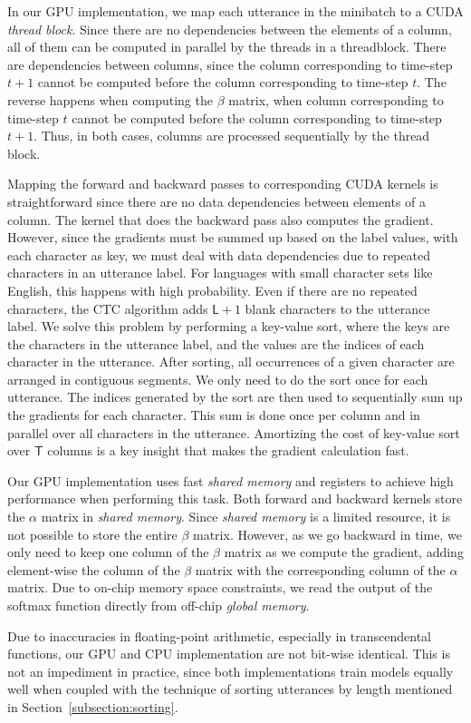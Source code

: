 \documentclass{article}
\begin{document}
In our GPU implementation, we map each utterance in the minibatch to a CUDA \emph{thread block}. Since there are no dependencies between the elements of a column, all of them can be computed in parallel by the threads in a threadblock. There are dependencies between columns, since the column corresponding to time-step $t+1$ cannot be computed before the column corresponding to time-step $t$. The reverse happens when computing the $\beta$ matrix, when column corresponding to time-step $t$ cannot be computed before the column corresponding to time-step $t+1$. Thus, in both cases, columns are processed sequentially by the thread block. 

Mapping the forward and backward passes to corresponding CUDA kernels is straightforward since there are no data dependencies between elements of a column. The kernel that does the backward pass also computes the gradient. However, since the gradients must be summed up based on the label values, with each character as key, we must deal with data dependencies due to repeated characters in an utterance label. For languages with small character sets like English, this happens with high probability. Even if there are no repeated characters, the CTC algorithm adds $\mathsf{L}+1$ blank characters to the utterance label. 
We solve this problem by performing a key-value sort, where the keys are the characters in the utterance label, and the values are the indices of each character in the utterance. After sorting, all occurrences of a given character are arranged in contiguous segments. We only need to do the sort once for each utterance. The indices generated by the sort are then used to sequentially sum up the gradients for each character. This sum is done once per column and in parallel over all characters in the utterance. Amortizing the cost of key-value sort over $\mathsf{T}$ columns is a key insight that makes the gradient calculation fast.

Our GPU implementation uses fast \emph{shared memory} and registers to achieve high performance when performing this task. Both forward and backward kernels store the $\alpha$ matrix in \emph{shared memory}. Since \emph{shared memory} is a limited resource, it is not possible to store the entire $\beta$ matrix. However, as we go backward in time, we only need to keep one column of the $\beta$ matrix as we compute the gradient, adding element-wise the column of the $\beta$ matrix with the corresponding column of the $\alpha$ matrix. Due to on-chip memory space constraints, we read the output of the softmax function directly from off-chip \emph{global memory}. 

Due to inaccuracies in floating-point arithmetic, especially in transcendental functions, our GPU and CPU implementation are not bit-wise identical. This is not an impediment in practice, since both implementations train models equally well when coupled with the technique of sorting utterances by length mentioned in Section~\ref{subsection:sorting}. 
\end{document}
